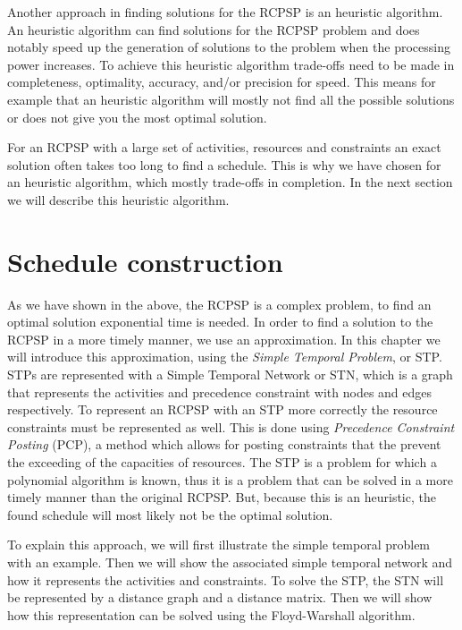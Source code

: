 \documentclass{article}
\theoremstyle{definition}
\begin{document}
Another approach in finding solutions for the RCPSP is an heuristic algorithm.
An heuristic algorithm can find solutions for the RCPSP problem and does notably speed up the generation of solutions to the problem when the processing power increases.
To achieve this heuristic algorithm trade-offs need to be made in completeness, optimality, accuracy, and/or precision for speed.
This means for example that an heuristic algorithm will mostly not find all the possible solutions or does not give you the most optimal solution.

For an RCPSP with a large set of activities, resources and constraints an exact solution often takes too long to find a schedule.
This is why we have chosen for an heuristic algorithm, which mostly trade-offs in completion.
In the next section we will describe this heuristic algorithm.


\newpage


\section{Schedule construction}
\label{text:schedule}

As we have shown in the above, the RCPSP is a complex problem, to find an optimal solution exponential time is needed.
In order to find a solution to the RCPSP in a more timely manner, we use an approximation.
In this chapter we will introduce this approximation, using the \emph{Simple Temporal Problem}, or STP.
STPs are represented with a Simple Temporal Network or STN, which is a graph that represents the activities and precedence constraint with nodes and edges respectively.
To represent an RCPSP with an STP more correctly the resource constraints must be represented as well. 
This is done using \emph{Precedence Constraint Posting} (PCP), a method which allows for posting constraints that the prevent the exceeding of the capacities of resources.
The STP is a problem for which a polynomial algorithm is known, thus it is a problem that can be solved in a more timely manner than the original RCPSP.
But, because this is an heuristic, the found schedule will most likely not be the optimal solution.

To explain this approach, we will first illustrate the simple temporal problem with an example.
Then we will show the associated simple temporal network and how it represents the activities and constraints.
To solve the STP, the STN will be represented by a distance graph and a distance matrix.
Then we will show how this representation can be solved using the Floyd-Warshall algorithm.
\end{document}

